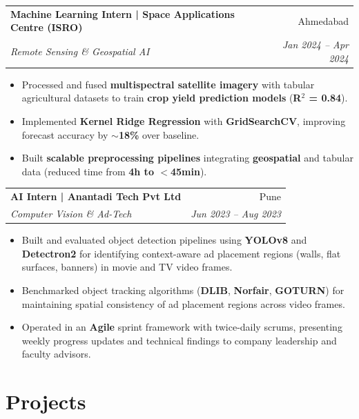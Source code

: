 \documentclass[11pt,a4paper]{article}
\makeatletter
\newcommand{\resumeSubheading}[4]{
    \vspace{4pt}
    \begin{tabular*}{\textwidth}{@{} p{0.73\textwidth} @{\extracolsep{\fill}} r @{}}
        \textbf{#1} & #2 \\
        \textit{#3} & \textit{#4} \\
    \end{tabular*}
    \vspace{2pt}
}
\makeatother
\begin{document}
\resumeSubheading
    {Machine Learning Intern | Space Applications Centre (ISRO)}
    {Ahmedabad}
    {Remote Sensing \& Geospatial AI}
    {Jan 2024 -- Apr 2024}
\begin{itemize}[leftmargin=*, itemsep=3pt, parsep=1pt]
    \item Processed and fused \textbf{multispectral satellite imagery} with tabular agricultural datasets to train \textbf{crop yield prediction models} (\textbf{R$^2$ = 0.84}).
    \item Implemented \textbf{Kernel Ridge Regression} with \textbf{GridSearchCV}, improving forecast accuracy by $\sim$\textbf{18\%} over baseline.
    \item Built \textbf{scalable preprocessing pipelines} integrating \textbf{geospatial} and tabular data (reduced time from \textbf{4h to $<$45min}).
\end{itemize}

\resumeSubheading
    {AI Intern | Anantadi Tech Pvt Ltd}
    {Pune}
    {Computer Vision \& Ad-Tech}
    {Jun 2023 -- Aug 2023}
\begin{itemize}[leftmargin=*, itemsep=3pt, parsep=1pt]
    \item Built and evaluated object detection pipelines using \textbf{YOLOv8} and \textbf{Detectron2} for identifying context-aware ad placement regions (walls, flat surfaces, banners) in movie and TV video frames.
    \item Benchmarked object tracking algorithms (\textbf{DLIB}, \textbf{Norfair}, \textbf{GOTURN}) for maintaining spatial consistency of ad placement regions across video frames.
    \item Operated in an \textbf{Agile} sprint framework with twice-daily scrums, presenting weekly progress updates and technical findings to company leadership and faculty advisors.
\end{itemize}

\section{Projects}
\end{document}
